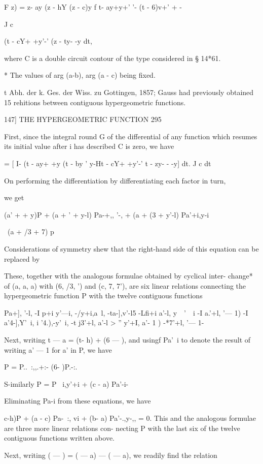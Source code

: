F z) = z- ay (z - hY (z - c)y f t- ay+y+' '- (t - 6)v+' + -

J c

(t - cY+ +y'-' (z - ty- -y dt,

where C is a double circuit contour of the type considered in § 14*61.

* The values of arg (a-b), arg (a - c) being fixed.

t Abh. der k. Ges. der Wiss. zu Gottingen, 1857; Gauss had previously
obtained 15 rehitions between contiguous hypergeometric functions.



147] THE HYPERGEOMETRIC FUNCTION 295

First, since the integral round G of the differential of any function
which resumes its initial value after i has described C is zero, we
have

= [ I- (t - ay+ +y (t - by ' y-Ht - cY+ +y'-' t - zy- - -y] dt. J c dt

On performing the differentiation by differentiating each factor in
turn,

we get

(a' + + y)P + (a + ' + y-l) Pa-+,, '-, + (a + (3 + y'-l) Pa'+i,y-i

\ (a + /3 + 7) p

Considerations of symmetry shew that the right-hand side of this
equation can be replaced by

These, together with the analogous formulae obtained by cyclical
inter- change* of (a, a, a) with (6, /3, ') and (c, 7, 7'), are six
linear relations connecting the hypergeometric function P with the
twelve contiguous functions

Pa+], '-l, -I p+i y'—i, -/y+i,a\ l, -ta-],v'-l5 -Lfi+i a'-l, y~\, '~\
i -I a.'+l, '— 1) -I a'4-],Y'\ i, i '4.),-y'\ i, -t j3'+l, a'-l > ''
y'+I, a'- 1 ) -*7'+l, '— 1-

Next, writing t — a = (t- h) + (6 — ), and usingf Pa'\ i to denote the
result of writing a' — 1 for a' in P, we have

P = P..\ :,,.+:- (6- )P.-:.

S-imilarly P = P \ i,y'+i + (c - a) Pa'-i-

Eliminating Pa-i from these equations, we have

 c-h)P + (a - c) Pa-\ :, vi + (b- a) Pa'-.,y-,, = 0. This and the
analogous formulae are three more linear relations con- necting P with
the last six of the twelve contiguous functions written above.

Next, writing ( — ) = ( — a) — ( — a), we readily find the relation

